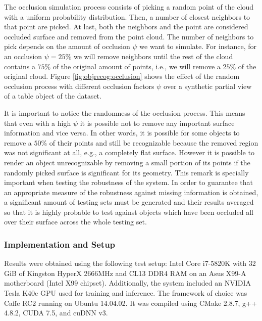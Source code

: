 The occlusion simulation process consists of picking a random point of the cloud with a uniform probability distribution. Then, a number of closest neighbors to that point are picked. At last, both the neighbors and the point are considered occluded surface and removed from the point cloud. The number of neighbors to pick depends on the amount of occlusion $\psi$ we want to simulate. For instance, for an occlusion $\psi=25\%$ we will remove neighbors until the rest of the cloud contains a $75\%$ of the original amount of points, i.e., we will remove a $25\%$ of the original cloud. Figure \ref{fig:objrecog:occlusion} shows the effect of the random occlusion process with different occlusion factors $\psi$ over a synthetic partial view of a table object of the dataset.

It is important to notice the randomness of the occlusion process. This means that even with a high $\psi$ it is possible not to remove any important surface information and vice versa. In other words, it is possible for some objects to remove a $50\%$ of their points and still be recognizable because the removed region was not significant at all, e.g., a completely flat surface. However it is possible to render an object unrecognizable by removing a small portion of its points if the randomly picked surface is significant for its geometry. This remark is specially important when testing the robustness of the system. In order to guarantee that an appropriate measure of the robustness against missing information is obtained, a significant amount of testing sets must be generated and their results averaged so that it is highly probable to test against objects which have been occluded all over their surface across the whole testing set.

\subsubsection{Implementation and Setup}
\label{cha:objrecog:sec:study:subsec:experiments:subsubsec:setup}


Results were obtained using the following test setup: Intel Core i7-5820K with 32 GiB of Kingston HyperX 2666MHz and CL13 DDR4 RAM on an Asus X99-A motherboard (Intel X99 chipset). Additionally, the system included an NVIDIA Tesla K40c GPU used for training and inference. The framework of choice was Caffe RC2 running on Ubuntu 14.04.02. It was compiled using CMake 2.8.7, g++ 4.8.2, CUDA 7.5, and cuDNN v3.

